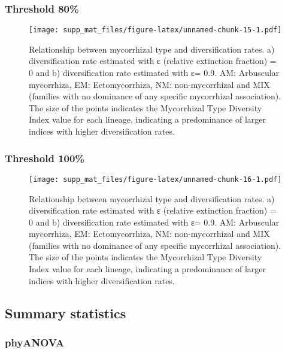 \documentclass[]{article}
\begin{document}
\hypertarget{threshold-80-1}{%
\subsubsection{Threshold 80\%}\label{threshold-80-1}}

\begin{figure}
\centering
\texttt{[image: supp\_mat\_files/figure-latex/unnamed-chunk-15-1.pdf]}
\caption{Relationship between mycorrhizal type and diversification
rates. a) diversification rate estimated with ε (relative extinction
fraction) = 0 and b) diversification rate estimated with ε= 0.9. AM:
Arbuscular mycorrhiza, EM: Ectomycorrhiza, NM: non-mycorrhizal and MIX
(families with no dominance of any specific mycorrhizal association).
The size of the points indicates the Mycorrhizal Type Diversity Index
value for each lineage, indicating a predominance of larger indices with
higher diversification rates.}
\end{figure}

\hypertarget{threshold-100-1}{%
\subsubsection{Threshold 100\%}\label{threshold-100-1}}

\begin{figure}
\centering
\texttt{[image: supp\_mat\_files/figure-latex/unnamed-chunk-16-1.pdf]}
\caption{Relationship between mycorrhizal type and diversification
rates. a) diversification rate estimated with ε (relative extinction
fraction) = 0 and b) diversification rate estimated with ε= 0.9. AM:
Arbuscular mycorrhiza, EM: Ectomycorrhiza, NM: non-mycorrhizal and MIX
(families with no dominance of any specific mycorrhizal association).
The size of the points indicates the Mycorrhizal Type Diversity Index
value for each lineage, indicating a predominance of larger indices with
higher diversification rates.}
\end{figure}

\hypertarget{summary-statistics-1}{%
\subsection{Summary statistics}\label{summary-statistics-1}}

\hypertarget{phyanova-2}{%
\subsubsection{phyANOVA}\label{phyanova-2}}
\end{document}
